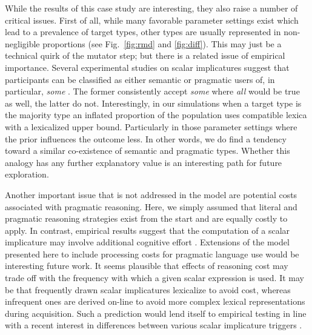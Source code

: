 \documentclass[a4paper, 11pt]{article}
\theoremstyle{Satz}
\begin{document}
While the results of this case study are interesting, they also raise a number of critical
issues. First of all, while many favorable parameter settings exist which lead to a prevalence
of target types, other types are usually represented in non-negligible proportions (see Fig.~\ref{fig:rmd} and \ref{fig:diff}). This may
just be a technical quirk of the mutator step; but there is a related issue of empirical
importance. Several experimental studies on scalar implicatures suggest that participants can
be classified as either semantic or pragmatic users of, in particular, \emph{some}
\citep[e.g.,][]{BottNoveck2004:Some-Utterances,NieuwlandDitman2010:On-the-incremen,DegenTanenhaus2012:Processing-Scal}. The
former consistently accept \emph{some} where \emph{all} would be true as well, the latter do
not. Interestingly, in our simulations when a target type is the majority type an inflated
proportion of the population uses compatible lexica with a lexicalized upper
bound. Particularly in those parameter settings where the prior influences the outcome less. In
other words, we do find a tendency toward a similar co-existence of semantic and pragmatic
types. Whether this analogy has any further explanatory value is an interesting path for future
exploration.

Another important issue that is not addressed in the model are potential costs associated with
pragmatic reasoning. Here, we simply assumed that literal and pragmatic reasoning strategies
exist from the start and are equally costly to apply. In contrast, empirical results suggest
that the computation of a scalar implicature may involve additional cognitive effort
\citep[e.g.,][]{BrehenyKatsos2006:Are-Generalised,deNeys+schaeken:2007,huang+snedeker:2009,Jr.Bailey2013:Possibly-all-of}. Extensions
of the model presented here to include processing costs for pragmatic language use would be
interesting future work. It seems plausible that effects of reasoning cost may trade off with
the frequency with which a given scalar expression is used. It may be that frequently drawn
scalar implicatures lexicalize to avoid cost, whereas infrequent ones are derived on-line to
avoid more complex lexical representations during acquisition. Such a prediction would lend itself to
empirical testing in line with a recent interest in differences between various scalar
implicature triggers \citep{Tielvan-TielMiltenburgvan-Miltenburg2014:Scalar-Diversit}. 
\end{document}
